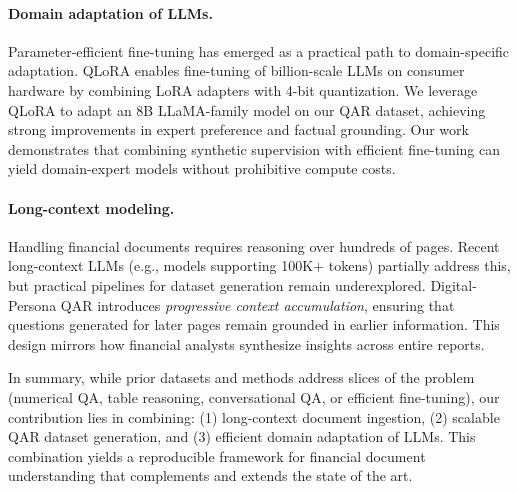 \documentclass[sigconf,authordraft,anonymous]{acmart}
\begin{document}
\paragraph{Domain adaptation of LLMs.}
Parameter-efficient fine-tuning has emerged as a practical path to domain-specific adaptation. QLoRA \cite{dettmers2023qloraefficientfinetuningquantized} enables fine-tuning of billion-scale LLMs on consumer hardware by combining LoRA adapters with 4-bit quantization. We leverage QLoRA to adapt an 8B LLaMA-family model on our QAR dataset, achieving strong improvements in expert preference and factual grounding. Our work demonstrates that combining synthetic supervision with efficient fine-tuning can yield domain-expert models without prohibitive compute costs.

\paragraph{Long-context modeling.}
Handling financial documents requires reasoning over hundreds of pages. Recent long-context LLMs (e.g., models supporting 100K+ tokens) partially address this, but practical pipelines for dataset generation remain underexplored. Digital-Persona QAR introduces \emph{progressive context accumulation}, ensuring that questions generated for later pages remain grounded in earlier information. This design mirrors how financial analysts synthesize insights across entire reports.

In summary, while prior datasets and methods address slices of the problem (numerical QA, table reasoning, conversational QA, or efficient fine-tuning), our contribution lies in combining: (1) long-context document ingestion, (2) scalable QAR dataset generation, and (3) efficient domain adaptation of LLMs. This combination yields a reproducible framework for financial document understanding that complements and extends the state of the art.
\end{document}
